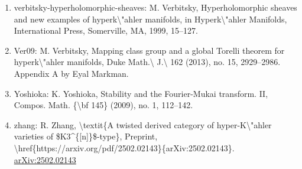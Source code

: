 \documentclass[11pt]{article}
\begin{document}
\begin{enumerate}[leftmargin=*]
  \item verbitsky-hyperholomorphic-sheaves: M. Verbitsky, Hyperholomorphic sheaves and new examples of hyperk\textbackslash{}"ahler manifolds, in Hyperk\textbackslash{}"ahler Manifolds, International Press, Somerville, MA, 1999, 15--127.
  \item Ver09: M. Verbitsky, Mapping class group and a global Torelli theorem for hyperk\textbackslash{}"ahler manifolds, Duke Math.\textbackslash{} J.\textbackslash{} 162 (2013), no. 15, 2929--2986. Appendix A by Eyal Markman.
  \item Yoshioka: K. Yoshioka, Stability and the Fourier-Mukai transform. II, Compos. Math. \{\textbackslash{}bf 145\} (2009), no. 1, 112--142.
  \item zhang: R. Zhang, \textbackslash{}textit\{A twisted derived category of hyper-K\textbackslash{}"ahler varieties of \$K3\^{}\{[n]\}\$-type\}, Preprint, \textbackslash{}href\{https://arxiv.org/pdf/2502.02143\}\{arXiv:2502.02143\}. \href{https://arxiv.org/abs/2502.02143}{arXiv:2502.02143}
\end{enumerate}

% 
% 
\end{document}
